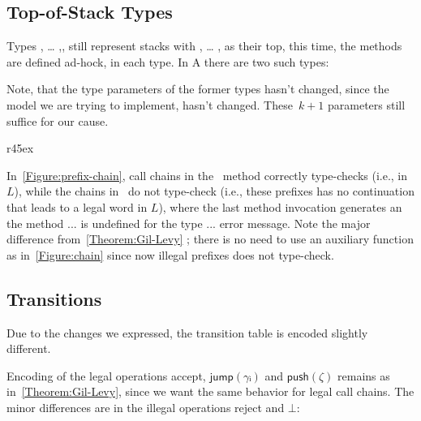 \subsection{Top-of-Stack Types}
Types , … ,, still represent stacks
  with , … , as their top,
  this time, the methods are defined ad-hock, in each type.
In A there are two such types:

\begin{quote}
\end{quote}

Note, that the type parameters of the former types hasn't changed,
  since the model we are trying to implement, hasn't changed.
  These~$k+1$ parameters still suffice for our cause.

\begin{wrapfigure}[14]r{45ex}
  \caption{\label{Figure:prefix-chain} Accepting and non-accepting call chains with the
  type encoding of jDPDA~$A$ (as defined in \cref{Table:A}), such that 
  illegal prefixes won't compile}
\end{wrapfigure}

In~\cref{Figure:prefix-chain}, call chains in the~ method 
  correctly type-checks (i.e., in $L$), while the chains in~ 
  do not type-check (i.e., these prefixes has no continuation that leads to a legal word in $L$), 
  where the last method invocation generates an \textsf{the method ... is undefined for the type ...}
  error message.
Note the major difference from~\cref{Theorem:Gil-Levy} ; there is no need to
  use an auxiliary function  as in~\cref{Figure:chain} since now illegal
  prefixes does not type-check.
  
\subsection{Transitions}
Due to the changes we expressed, the transition table is encoded slightly different.

Encoding of the legal operations \textsf{accept}, $\textsf{jump}(γᵢ)$ and $\textsf{push}(\zeta)$
  remains as in~\cref{Theorem:Gil-Levy}, since we want the same behavior for legal call chains.
The minor differences are in the illegal operations \textsf{reject} and $\bot$:

